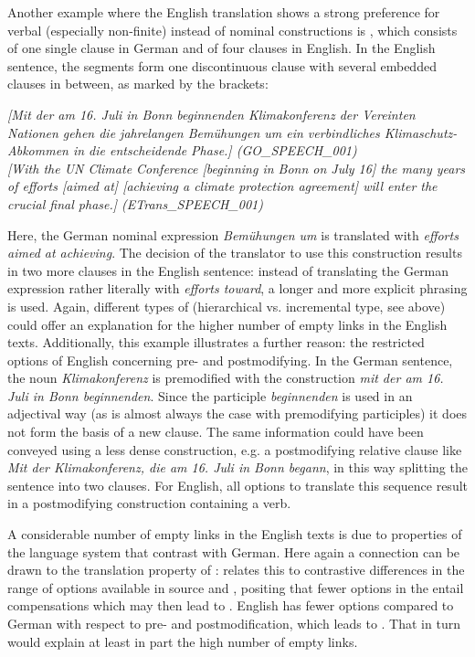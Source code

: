 \documentclass[output=paper]{LSP/langsci}
\begin{document}
Another example where the English translation shows a strong preference for verbal (especially non-finite) instead of nominal constructions is , which consists of one single clause in German and of four clauses in English. In the English sentence, the segments form one discontinuous clause with several embedded clauses in between, as marked by the brackets: 


\ea \label{ex:culo:14}
  \ea \textit{[Mit der am 16. Juli in Bonn beginnenden Klimakonferenz der Vereinten Nationen gehen die jahrelangen Bemühungen um ein verbindliches Klimaschutz-Abkommen in die entscheidende Phase.] \textup{(GO\_SPEECH\_001)}}\\
   \ex \textit{[With the UN Climate Conference [beginning in Bonn on July 16] the many years of efforts [aimed at] [achieving a climate protection agreement] will enter the crucial final phase.] \textup{(ETrans\_SPEECH\_001)}}
   \z
\z

Here, the German nominal expression \textit{Bemühungen um} is translated with \textit{efforts aimed at achieving}. The decision of the translator to use this construction results in two more clauses in the English sentence: instead of translating the German expression rather literally with \textit{efforts toward}, a longer and more explicit phrasing is used. Again, different types of  (hierarchical vs. incremental type, see above) could offer an explanation for the higher number of empty links in the English texts. Additionally, this example illustrates a further reason: the restricted options of English concerning pre- and postmodifying. In the German sentence, the noun \textit{Klimakonferenz} is premodified with the construction \textit{mit der am 16. Juli in Bonn beginnenden}. Since the participle \textit{beginnenden} is used in an adjectival way (as is almost always the case with premodifying participles) it does not form the basis of a new clause. The same information could have been conveyed using a less dense construction, e.g. a postmodifying relative clause like \textit{Mit der Klimakonferenz, die am 16. Juli in Bonn begann}, in this way splitting the sentence into two clauses. For English, all options to translate this sequence result in a postmodifying construction containing a verb. 


A considerable number of empty links in the English texts is due to properties of the language system that contrast with German. Here again a connection can be drawn to the translation property of : \citet[218]{Teich2003} relates this to contrastive differences in the range of options available in source and , positing that fewer options in the  entail compensations which may then lead to . English has fewer options compared to German with respect to pre- and postmodification, which leads to . That in turn would explain at least in part the high number of empty links. 
\end{document}

